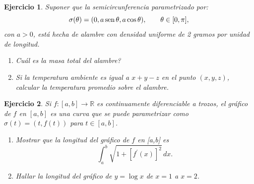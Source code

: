 \documentclass[11pt,a4paper,pdftex]{amsart}
\newtheorem{ej}{Ejercicio}%
\numberwithin{equation}{section}%
\newcommand{\bej}[1]{\begin{ej}\rm{#1}}
\newcommand{\eej}{\end{ej}\vspace{-0.2cm}}
\newcommand{\0}{\mathbb O}
\newcommand{\8}{\infty}
\begin{document}
\bej  Suponer que la semicircunferencia parametrizado por:
\[
\sigma (\theta)= (0,a\,\mbox{sen\,} \theta ,a\cos \theta
),\qquad \theta\in[0,\pi ],
\]
con $a>0$, est\'{a} hecha de alambre con densidad uniforme de 2 gramos por unidad de
longitud.
\begin{enumerate}
\item[a).]  \textquestiondown Cu\'{a}l es la masa total del alambre?
\item[b).]  Si la temperatura ambiente es igual a $x+y-z$ en el punto $(x,y,z)$, calcular la temperatura
promedio sobre el alambre.
\end{enumerate}
\eej

\bej  Si $f:[a,b]\to \mathbb{R}$ es continuamente diferenciable a trozos,
 el gr\'{a}fico de $f$ en $[a,b]$ es una curva que se puede parametrizar como $\sigma(t)= (t,f(t))$ para $t\in [a,b]$.


\begin{enumerate}
\item[a).]  Mostrar que la longitud del gr\'{a}fico de $f$ en [a,b] es
\[
\int^b_a\sqrt{1+[f^{\prime }(x)]^2}\,dx.
\]

\item[b).]  Hallar la longitud del  gr\'{a}fico de $y=\log x$ de $x=1$ a $x=2$.
\end{enumerate}
\eej





\end{document}
